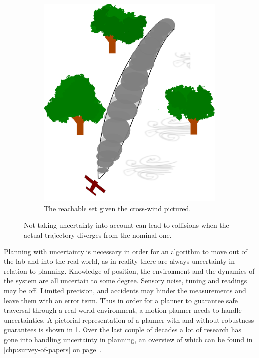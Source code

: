\begin{figure}
\begin{subfigure}{0.4\textwidth}
    \includegraphics[width=.95\textwidth]{figures/experiments/experiment-setup-funnel}
    \caption{The reachable set given the cross-wind pictured.\newline}
  \end{subfigure}
  \caption[Airplane model in a crosswind]{Not taking uncertainty into account can lead to collisions when the
    actual trajectory diverges from the nominal one.}
  \label{fig:motion-planning-uncertainty}
\end{figure}

Planning with uncertainty is necessary in order for an algorithm to move out of
the lab and into the real world, as in reality there are always uncertainty in
relation to planning. Knowledge of position, the environment and the dynamics of
the system are all uncertain to some degree. Sensory noise, tuning and readings
may be off. Limited precision, and accidents may hinder the measurements and
leave them with an error term. Thus in order for a planner to guarantee safe
traversal through a real world environment, a motion planner needs to handle
uncertainties. A pictorial representation of a planner with and without
robustness guarantees is shown in \cref{fig:motion-planning-uncertainty}. Over
the last couple of decades a lot of research has gone into handling uncertainty
in planning, an overview of which can be found in \cref{chp:survey-of-papers} on
page~\pageref{chp:survey-of-papers}.

